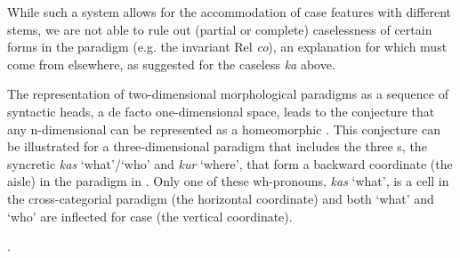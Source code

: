 While such a system allows for the accommodation of case features with different stems, we are not able to rule out (partial or complete) caselessness of certain forms in the paradigm (e.g. the  invariant Rel \textit{co}), an explanation for which must come from elsewhere, as suggested for the  caseless \textit{ka} above.
\par
The representation of two-dimensional morphological paradigms as a sequence of syntactic heads, a de facto one-dimensional space, leads to the conjecture that any n-dimensional  can be represented as a homeomorphic . This conjecture can be illustrated for a three-dimensional paradigm that includes the three  s, the syncretic \textit{kas} `what'/`who' and \textit{kur} `where', that form a backward coordinate (the aisle) in the paradigm in \Next. Only one of these wh-pronouns, \textit{kas} `what', is a cell in the cross-categorial paradigm (the horizontal coordinate) and both `what' and `who' are inflected for case (the vertical coordinate).

\ex.\label{3D}

